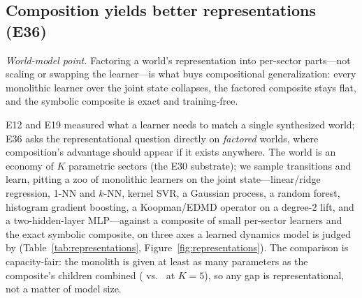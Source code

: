 \documentclass[11pt]{article}
\begin{document}
\subsection{Composition yields better representations (E36)}\label{sec:representations}

\emph{World-model point.} Factoring a world's representation into per-sector parts---not scaling
or swapping the learner---is what buys compositional generalization: every monolithic learner
over the joint state collapses, the factored composite stays flat, and the symbolic composite is
exact and training-free.

E12 and E19 measured what a learner needs to match a single
synthesized world; E36 asks the representational question directly on
\emph{factored} worlds, where composition's advantage should appear if it
exists anywhere. The world is an economy of $K$ parametric sectors (the E30
substrate); we sample transitions and learn, pitting a zoo of
\RepNumMono{} monolithic learners on the joint state---linear/ridge
regression, 1-NN and $k$-NN, kernel SVR, a Gaussian process, a random
forest, histogram gradient boosting, a Koopman/EDMD operator on a degree-2
lift, and a two-hidden-layer MLP---against a composite of small per-sector
learners and the exact symbolic composite, on three axes a learned dynamics
model is judged by (Table~\ref{tab:representations},
Figure~\ref{fig:representations}). The comparison is capacity-fair: the
monolith is given at least as many parameters as the composite's children
combined (\RepMonoParams{} vs.\ \RepCompParams{} at $K{=}5$), so any gap is
representational, not a matter of model size.
\end{document}
